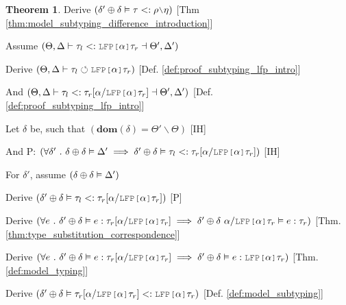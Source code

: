 \documentclass[acmsmall]{acmart}
\theoremstyle{definition}
\newtheorem{theorem}{Theorem}[section]
\begin{document}
\begin{theorem}
  \item \I\I \N Derive $(
    \delta' \oplus \delta \satisfies \tau \subtypes \rho \typdiff \eta
  )$ [Thm \ref{thm:model_subtyping_difference_introduction}]



  \item \N Assume $(
    \Theta, \Delta \entails
    \tau_l \subtypes \J{LFP[} \alpha \J{]}\tau_r \given \Theta', \Delta'
  )$
  \item \I \N Derive $(
    \Theta, \Delta \entails \tau_l \circlearrowleft \J{LFP[} \alpha \J{]} \tau_r
  )$ [Def. \ref{def:proof_subtyping_lfp_intro}]
  \item \I \N And $(
    \Theta, \Delta \entails
    \tau_l \subtypes \tau_r[\alpha \slash \J{LFP[} \alpha \J{]} \tau_r]
    \given \Theta', \Delta'
  )$ [Def. \ref{def:proof_subtyping_lfp_intro}]

  \item \I \N Let $\delta$ be, such that $(
    \textbf{dom}(\delta) = \Theta' \backslash \Theta
  )$ [IH]
  \item \I \N And P: $(
    \forall \delta' \qua 
    \delta \oplus \delta \satisfies \Delta' 
    \implies 
    \delta' \oplus \delta \satisfies
    \tau_l \subtypes \tau_r[\alpha \slash \J{LFP[} \alpha \J{]} \tau_r]
  )$ [IH]

  \item \I \N For $\delta'$, assume $(
    \delta \oplus \delta \vDash \Delta'
  )$

  \item \I\I \N Derive $(
    \delta' \oplus \delta \satisfies
    \tau_l \subtypes \tau_r[\alpha \slash \J{LFP[} \alpha \J{]} \tau_r]
  )$ [P]

  \item \I\I \N Derive $(
    \forall e \qua
    \delta' \oplus \delta \satisfies
    e \hastype \tau_r[\alpha \slash \J{LFP[} \alpha \J{]} \tau_r] 
    \implies 
    \delta' \oplus \delta\ \alpha \slash \J{LFP[} \alpha \J{]} \tau_r \satisfies
    e \hastype
    \tau_r
  )$ [Thm. \ref{thm:type_substitution_correspondence}]

  \item \I\I \N Derive $(
    \forall e \qua
    \delta' \oplus \delta \satisfies
    e \hastype \tau_r[\alpha \slash \J{LFP[} \alpha \J{]} \tau_r] 
    \implies 
    \delta' \oplus \delta \satisfies
    e \hastype
    \J{LFP[} \alpha \J{]} \tau_r
  )$ [Thm. \ref{def:model_typing}]

  \item \I\I \N Derive $(
    \delta' \oplus \delta \satisfies
    \tau_r[\alpha \slash \J{LFP[} \alpha \J{]} \tau_r] \subtypes \J{LFP[} \alpha \J{]} \tau_r
  )$ [Def. \ref{def:model_subtyping}]


\end{theorem}
\end{document}
